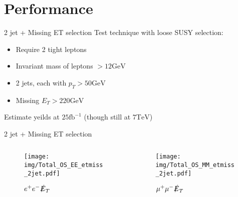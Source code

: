 \documentclass{beamer}
\begin{document}
\section{Performance}

\begin{frame}{2 jet + Missing ET selection}
Test technique with loose SUSY selection:
\begin{itemize}
\item Require 2 tight leptons
\item Invariant mass of leptons $> 12\text{GeV}$
\item 2 jets, each with $p_T > 50\text{GeV}$
\item Missing $E_T > 220\text{GeV}$
\end{itemize}
Estimate yeilds at $25\text{fb}^{-1}$ (though still at $7 \text{TeV}$)
\end{frame}

\begin{frame}{2 jet + Missing ET selection}
  \begin{columns}
    \begin{column}{0.45\textwidth}\begin{figure}
      \caption{$e^{+}e^{-}\slashed{E}_{T}$}
      \texttt{[image: img/Total\_OS\_EE\_etmiss\_2jet.pdf]}
    \end{figure}\end{column}
    \begin{column}{0.45\textwidth}\begin{figure}
      \caption{$\mu^{+}\mu^{-}\slashed{E}_{T}$}
      \texttt{[image: img/Total\_OS\_MM\_etmiss\_2jet.pdf]}
    \end{figure}\end{column}
  \end{columns}
\end{frame}

\end{document}
